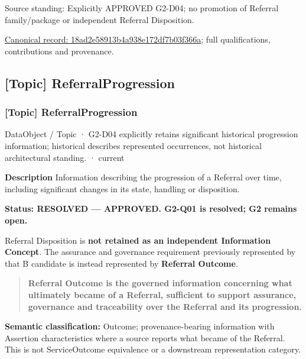 Source standing: Explicitly APPROVED G2-D04; no promotion of Referral family/package or independent Referral Disposition.


{\footnotesize \href{../../../../continuum/application/data-object/topic/18ad2e58913b4a938e172df7b03f366a.md}{Canonical record: 18ad2e58913b4a938e172df7b03f366a}; full qualifications, contributions and provenance.}\par
\subsection{[Topic] ReferralProgression}

\subsubsection{[Topic] ReferralProgression}

\label{element:bc70a1055ca34eed8143856816587f67}
{\small DataObject / Topic · G2-D04 explicitly retains significant historical progression information; historical describes represented occurrences, not historical architectural standing. · current}\par

\textbf{Description} 
Information describing the progression of a Referral over time, including significant changes in its state, handling or disposition.



\textbf{Status: RESOLVED — APPROVED. G2-Q01 is resolved; G2 remains open.}



Referral Disposition is \textbf{not retained as an independent Information Concept}. The assurance and governance requirement previously represented by that B candidate is instead represented by \textbf{Referral Outcome}.



\begin{quote}


\textbf{Referral Outcome is the governed information concerning what ultimately became of a Referral, sufficient to support assurance, governance and traceability over the Referral and its progression.}



\end{quote}


\textbf{Semantic classification:} Outcome; provenance-bearing information with Assertion characteristics where a source reports what became of the Referral. This is not ServiceOutcome equivalence or a downstream representation category.



